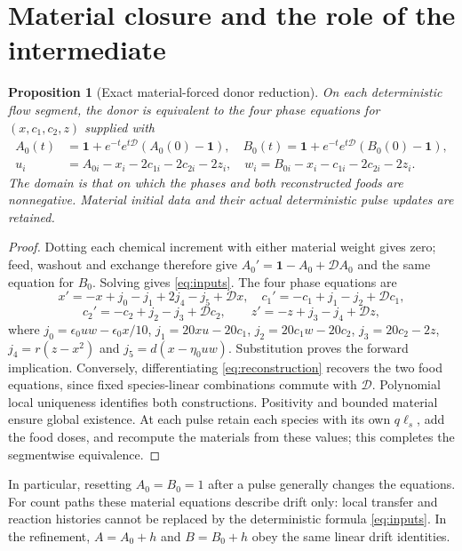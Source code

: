 \documentclass[11pt]{article}
\newtheorem{proposition}[theorem]{Proposition}
\theoremstyle{definition}\newtheorem{definition}[theorem]{Definition}
\begin{document}
\section{Material closure and the role of the intermediate}\label{sec:reduction}
\begin{proposition}[Exact material-forced donor reduction]\label{prop:reduction}
On each deterministic flow segment, the donor is equivalent to the four phase
equations for $(x,c_1,c_2,z)$ supplied with
\begin{align}
A_0(t)&=\mathbf1+e^{-t}e^{t\mathcal D}(A_0(0)-\mathbf1),\quad
B_0(t)=\mathbf1+e^{-t}e^{t\mathcal D}(B_0(0)-\mathbf1),\label{eq:inputs}\\
u_i&=A_{0i}-x_i-2c_{1i}-2c_{2i}-2z_i,\quad
w_i=B_{0i}-x_i-c_{1i}-2c_{2i}-2z_i.\label{eq:reconstruction}
\end{align}
The domain is that on which the phases and both reconstructed foods are nonnegative.
Material initial data and their actual deterministic pulse updates are retained.
\end{proposition}
\begin{proof}
Dotting each chemical increment with either material weight gives zero; feed,
washout and exchange therefore give $A_0'=\mathbf1-A_0+\mathcal DA_0$ and the
same equation for $B_0$. Solving gives \eqref{eq:inputs}. The four phase equations are
\[
 x'=-x+j_0-j_1+2j_4-j_5+\mathcal Dx,\quad
 c_1'=-c_1+j_1-j_2+\mathcal Dc_1,
\]
\[
c_2'=-c_2+j_2-j_3+\mathcal Dc_2,\qquad z'=-z+j_3-j_4+\mathcal Dz,
\]
where $j_0=\epsilon_0uw-\epsilon_0x/10$, $j_1=20xu-20c_1$,
$j_2=20c_1w-20c_2$, $j_3=20c_2-2z$, $j_4=r(z-x^2)$ and
$j_5=d(x-\eta_0uw)$. Substitution proves the forward implication. Conversely,
differentiating \eqref{eq:reconstruction} recovers the two food equations, since
fixed species-linear combinations commute with $\mathcal D$. Polynomial local
uniqueness identifies both constructions. Positivity and bounded material ensure
global existence. At each pulse retain each species with its own $q\ell_s$, add
the food doses, and recompute the materials from these values; this completes the
segmentwise equivalence.
\end{proof}
In particular, resetting $A_0=B_0=1$ after a pulse generally changes the equations.
For count paths these material equations describe drift only: local transfer and
reaction histories cannot be replaced by the deterministic formula \eqref{eq:inputs}.
In the refinement, $A=A_0+h$ and $B=B_0+h$ obey the same linear drift identities.
\end{document}
